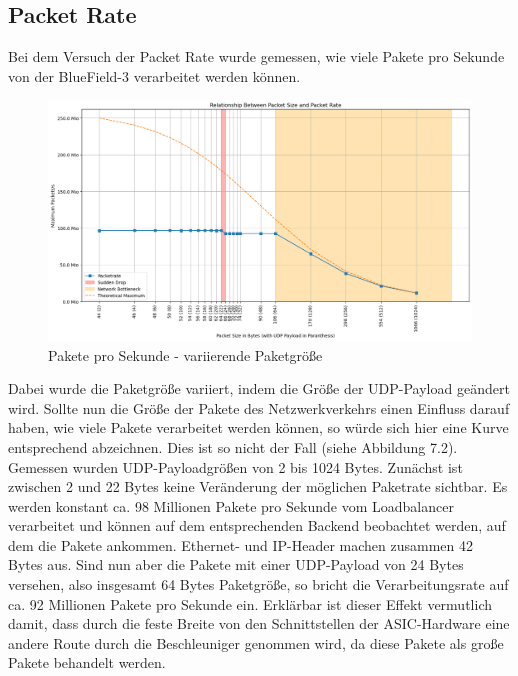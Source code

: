 \subsection{Packet Rate}
Bei dem Versuch der Packet Rate wurde gemessen, wie viele Pakete pro Sekunde von der BlueField-3 verarbeitet werden können.
\begin{figure}
    \centering
    \includegraphics[width=1\linewidth]{images/pps_pps.png}
    \caption{Pakete pro Sekunde - variierende Paketgröße}
    \label{fig:enter-label}
\end{figure}
Dabei wurde die Paketgröße variiert, indem die Größe der UDP-Payload geändert wird. Sollte nun die Größe der Pakete des Netzwerkverkehrs einen Einfluss darauf haben, wie viele Pakete verarbeitet werden können, so würde sich hier eine Kurve entsprechend abzeichnen. Dies ist so nicht der Fall (siehe Abbildung 7.2). Gemessen wurden UDP-Payloadgrößen von 2 bis 1024 Bytes. Zunächst ist zwischen 2 und 22 Bytes keine Veränderung der möglichen Paketrate sichtbar. Es werden konstant ca. 98 Millionen Pakete pro Sekunde vom Loadbalancer verarbeitet und können auf dem entsprechenden Backend beobachtet werden, auf dem die Pakete ankommen. Ethernet- und IP-Header machen zusammen 42 Bytes aus. Sind nun aber die Pakete mit einer UDP-Payload von 24 Bytes versehen, also insgesamt 64 Bytes Paketgröße, so bricht die Verarbeitungsrate auf ca. 92 Millionen Pakete pro Sekunde ein. Erklärbar ist dieser Effekt vermutlich damit, dass durch die feste Breite von den Schnittstellen der ASIC-Hardware eine andere Route durch die Beschleuniger genommen wird, da diese Pakete als große Pakete behandelt werden.


